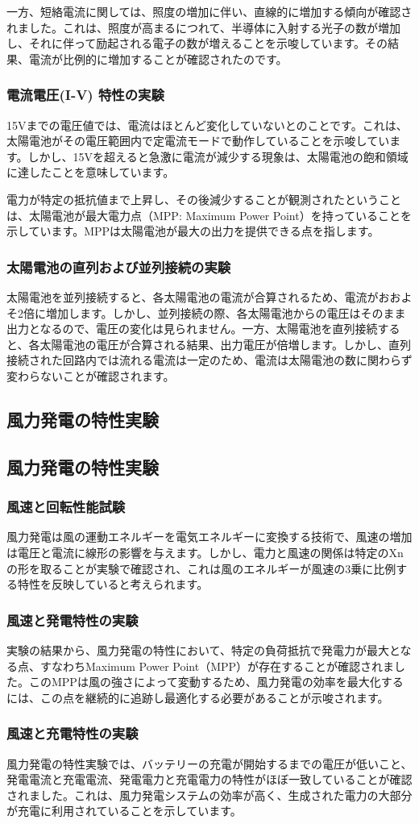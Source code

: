 \documentclass[a4paper,11pt,xelatex,ja=standard]{bxjsarticle}
\begin{document}
            一方、短絡電流に関しては、照度の増加に伴い、直線的に増加する傾向が確認されました。これは、照度が高まるにつれて、半導体に入射する光子の数が増加し、それに伴って励起される電子の数が増えることを示唆しています。その結果、電流が比例的に増加することが確認されたのです。
        \subsubsection{電流電圧(I-V) 特性の実験}
            15Vまでの電圧値では、電流はほとんど変化していないとのことです。これは、太陽電池がその電圧範囲内で定電流モードで動作していることを示唆しています。しかし、15Vを超えると急激に電流が減少する現象は、太陽電池の飽和領域に達したことを意味しています。
        
            電力が特定の抵抗値まで上昇し、その後減少することが観測されたということは、太陽電池が最大電力点（MPP: Maximum Power Point）を持っていることを示しています。MPPは太陽電池が最大の出力を提供できる点を指します。
        \subsubsection{太陽電池の直列および並列接続の実験}
            太陽電池を並列接続すると、各太陽電池の電流が合算されるため、電流がおおよそ2倍に増加します。しかし、並列接続の際、各太陽電池からの電圧はそのまま出力となるので、電圧の変化は見られません。一方、太陽電池を直列接続すると、各太陽電池の電圧が合算される結果、出力電圧が倍増します。しかし、直列接続された回路内では流れる電流は一定のため、電流は太陽電池の数に関わらず変わらないことが確認されます。    \subsection{風力発電の特性実験}
        
    \subsection{風力発電の特性実験}
        \subsubsection{風速と回転性能試験}
            風力発電は風の運動エネルギーを電気エネルギーに変換する技術で、風速の増加は電圧と電流に線形の影響を与えます。しかし、電力と風速の関係は特定のXnの形を取ることが実験で確認され、これは風のエネルギーが風速の3乗に比例する特性を反映していると考えられます。
        \subsubsection{風速と発電特性の実験}
            実験の結果から、風力発電の特性において、特定の負荷抵抗で発電力が最大となる点、すなわちMaximum Power Point（MPP）が存在することが確認されました。このMPPは風の強さによって変動するため、風力発電の効率を最大化するには、この点を継続的に追跡し最適化する必要があることが示唆されます。
        \subsubsection{風速と充電特性の実験}
            風力発電の特性実験では、バッテリーの充電が開始するまでの電圧が低いこと、発電電流と充電電流、発電電力と充電電力の特性がほぼ一致していることが確認されました。これは、風力発電システムの効率が高く、生成された電力の大部分が充電に利用されていることを示しています。
\end{document}
